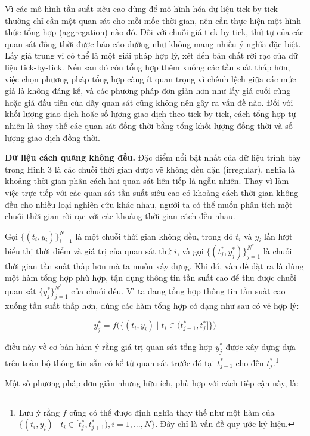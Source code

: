 Vì các mô hình tần suất siêu cao dùng để mô hình hóa dữ liệu tick-by-tick thường chỉ cần một quan sát cho mỗi mốc thời gian, nên cần thực hiện một hình thức tổng hợp (aggregation) nào đó. Đối với chuỗi giá tick-by-tick, thứ tự của các quan sát đồng thời được báo cáo dường như không mang nhiều ý nghĩa đặc biệt. Lấy giá trung vị có thể là một giải pháp hợp lý, xét đến bản chất rời rạc của dữ liệu tick-by-tick. Nếu sau đó còn tổng hợp thêm xuống các tần suất thấp hơn, việc chọn phương pháp tổng hợp càng ít quan trọng vì chênh lệch giữa các mức giá là không đáng kể, và các phương pháp đơn giản hơn như lấy giá cuối cùng hoặc giá đầu tiên của dãy quan sát cũng không nên gây ra vấn đề nào. Đối với khối lượng giao dịch hoặc số lượng giao dịch theo tick-by-tick, cách tổng hợp tự nhiên là thay thế các quan sát đồng thời bằng tổng khối lượng đồng thời và số lượng giao dịch đồng thời.

\noindent\textbf{Dữ liệu cách quãng không đều.} Đặc điểm nổi bật nhất của dữ liệu trình bày trong Hình 3 là các chuỗi thời gian được vẽ không đều đặn (irregular), nghĩa là khoảng thời gian phân cách hai quan sát liên tiếp là ngẫu nhiên. Thay vì làm việc trực tiếp với các quan sát tần suất siêu cao có khoảng cách thời gian không đều cho nhiều loại nghiên cứu khác nhau, người ta có thể muốn phân tích một chuỗi thời gian rời rạc với các khoảng thời gian cách đều nhau.

Gọi $\{(t_i,y_i)\}_{i=1}^{N}$ là một chuỗi thời gian không đều, trong đó $t_i$ và $y_i$ lần lượt biểu thị thời điểm và giá trị của quan sát thứ $i$, và gọi $\{(t_j^{*},y_j^{*})\}_{j=1}^{N^{*}}$ là chuỗi thời gian tần suất thấp hơn mà ta muốn xây dựng. Khi đó, vấn đề đặt ra là dùng một hàm tổng hợp phù hợp, tận dụng thông tin tần suất cao để thu được chuỗi quan sát $\{y_j^{*}\}_{j=1}^{N^{*}}$ của chuỗi đều. Vì ta đang tổng hợp thông tin tần suất cao xuống tần suất thấp hơn, dùng các hàm tổng hợp có dạng như sau có vẻ hợp lý:

\[
y_j^{*} = f\big(\{(t_i,y_i) \mid t_i \in (t_{j-1}^{*}, t_j^{*}]\}\big)
\]

điều này về cơ bản hàm ý rằng giá trị quan sát tổng hợp $y_j^{*}$ được xây dựng dựa trên toàn bộ thông tin sẵn có kể từ quan sát trước đó tại $t_{j-1}^{*}$ cho đến $t_j^{*}$.\footnote{Lưu ý rằng $f$ cũng có thể được định nghĩa thay thế như một hàm của $\{(t_i,y_i) \mid t_i \in [t_j^{*}, t_{j+1}^{*}), i=1,...,N\}$. Đây chỉ là vấn đề quy ước ký hiệu.}

Một số phương pháp đơn giản nhưng hữu ích, phù hợp với cách tiếp cận này, là:

